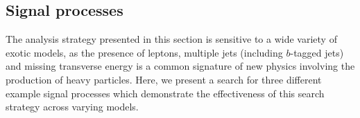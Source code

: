 \subsection{Signal processes}\label{sect:models}
The analysis strategy presented in this section is sensitive to a wide variety of exotic models, as the presence of leptons, multiple jets (including $b$-tagged jets) and missing transverse energy is a common signature of new physics involving the production of heavy particles.
Here, we present a search for three different example signal processes which demonstrate the effectiveness of this search strategy across varying models.

\begin{figure}[t]
\centering
{}

\end{figure}
